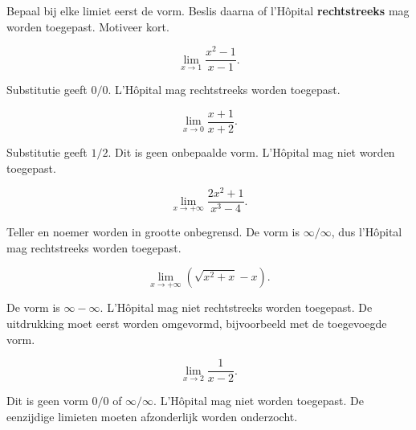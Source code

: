 \documentclass{ximera}
\begin{document}
\begin{oefening}{\oefB\ESS}

Bepaal bij elke limiet eerst de vorm. Beslis daarna of l'Hôpital
\textbf{rechtstreeks} mag worden toegepast. Motiveer kort.

\begin{question}
\[\lim_{x\to1}\frac{x^2-1}{x-1}.\]

\begin{oplossing}
Substitutie geeft \(0/0\). L'Hôpital mag rechtstreeks worden toegepast.
\end{oplossing}
\end{question}

\begin{question}
\[\lim_{x\to0}\frac{x+1}{x+2}.\]

\begin{oplossing}
Substitutie geeft \(1/2\). Dit is geen onbepaalde vorm. L'Hôpital mag
niet worden toegepast.
\end{oplossing}
\end{question}

\begin{question}
\[\lim_{x\to+\infty}\frac{2x^2+1}{x^3-4}.\]

\begin{oplossing}
Teller en noemer worden in grootte onbegrensd. De vorm is
\(\infty/\infty\), dus l'Hôpital mag rechtstreeks worden toegepast.
\end{oplossing}
\end{question}

\begin{question}
\[\lim_{x\to+\infty}\left(\sqrt{x^2+x}-x\right).\]

\begin{oplossing}
De vorm is \(\infty-\infty\). L'Hôpital mag niet rechtstreeks worden
toegepast. De uitdrukking moet eerst worden omgevormd, bijvoorbeeld met
de toegevoegde vorm.
\end{oplossing}
\end{question}

\begin{question}
\[\lim_{x\to2}\frac1{x-2}.\]

\begin{oplossing}
Dit is geen vorm \(0/0\) of \(\infty/\infty\). L'Hôpital mag niet worden
toegepast. De eenzijdige limieten moeten afzonderlijk worden onderzocht.
\end{oplossing}
\end{question}
\end{oefening}
\end{document}
